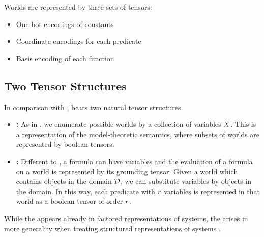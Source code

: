 Worlds are represented by three sets of tensors:
\begin{itemize}
    \item One-hot encodings of constants
    \item Coordinate encodings for each predicate
    \item Basis encoding of each function
\end{itemize}




\subsection{Two Tensor Structures}

In comparison with \propositionalLogic{}, \firstOrderLogic{} bears two natural tensor structures.
\begin{itemize}
    \item \textbf{\SemanticStructure{}:} As in \propositionalLogic{}, we enumerate possible worlds by a collection of variables $X$.
    This is a representation of the model-theoretic semantics, where subsets of worlds are represented by boolean tensors.
    \item \textbf{\SubstitutionStructure{}:}
    Different to \propositionalLogic{}, a formula can have variables and the evaluation of a formula on a world is represented by its grounding tensor.
    Given a world which contains objects in the domain $\mathcal{D}$, we can substitute variables by objects in the domain.
    In this way, each predicate with $r$ variables is represented in that world as a boolean tensor of order $r$.
\end{itemize}
While the \semanticStructure{} appears already in factored representations of systems, the \substitutionStructure{} arises in more generality when treating structured representations of systems \cite{russell_artificial_2021}.





